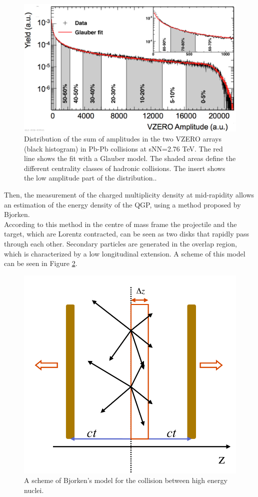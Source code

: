 \begin{figure}
  \centering
  \includegraphics[scale=0.14]{figures/cenclasses.png}
  \caption{Distribution of the sum of amplitudes in the two VZERO arrays (black histogram) in Pb-Pb collisions at sNN=2.76 TeV. The red line shows the fit with a Glauber model. The shaded areas define the different centrality classes of hadronic collisions. The insert shows the low amplitude part of the distribution.\cite{cenclasses}.}
  \label{fig:centr}
\end{figure}
%
Then, the measurement of the charged multiplicity density at mid-rapidity allows an estimation of the energy density of the QGP, using a method proposed by Bjorken\cite{bjorken}.\\
According to this method in the centre of mass frame the projectile and the target, which are Lorentz contracted, can be seen as two disks that rapidly pass through each other. Secondary particles are generated in the overlap region, which is characterized by a low longitudinal extension. A scheme of this model can be seen in Figure \ref{fig:bjor}.\\
%
\begin{figure}
  \centering
  \includegraphics[scale=0.3]{figures/bjorken.png}
  \caption{A scheme of Bjorken's model for the collision between high energy nuclei.}
  \label{fig:bjor}
\end{figure}
